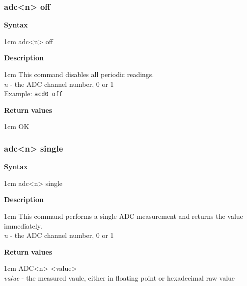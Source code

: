 \documentclass{article}[a4paper]
\begin{document}
\subsubsection{adc<n> off}
\begin{tcolorbox}
	{\bf Syntax}

	 1cm \dimexpr\linewidth-2cm\relax
	adc<n> off

	\medskip
	{\bf Description}

	 1cm \dimexpr\linewidth-2cm\relax
	This command disables all periodic readings. \\
	\medskip
	{\it n} - the ADC channel number, 0 or 1 \\
	\medskip
	Example: \texttt{acd0 off}

	\medskip
	{\bf Return values}

	 1cm \dimexpr\linewidth-2cm\relax
	OK
\end{tcolorbox}

\subsubsection{adc<n> single}
\begin{tcolorbox}
	{\bf Syntax}

	 1cm \dimexpr\linewidth-2cm\relax
	adc<n> single

	\medskip
	{\bf Description}

	 1cm \dimexpr\linewidth-2cm\relax
	This command performs a single ADC measurement and returns the value
	immediately. \\
	\medskip
	{\it n} - the ADC channel number, 0 or 1

	\medskip
	{\bf Return values}

	 1cm \dimexpr\linewidth-2cm\relax
	ADC<n> <value> \\
	{\it value} - the measured vaule, either in floating point or hexadecimal
	raw value
\end{tcolorbox}
\end{document}
